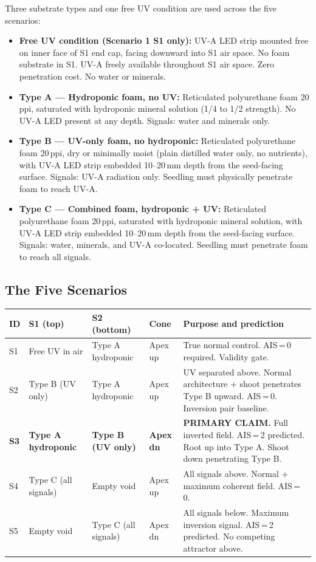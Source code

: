 \documentclass[10pt, a4paper]{article}
\begin{document}
Three substrate types and one free UV condition are
used across the five scenarios:

\begin{itemize}[itemsep=0.3em]
  \item \textbf{Free UV condition (Scenario 1 S1 only):}
    UV-A LED strip mounted free on inner face of S1 end cap,
    facing downward into S1 air space.
    No foam substrate in S1. UV-A freely available throughout
    S1 air space. Zero penetration cost.
    No water or minerals.

  \item \textbf{Type A --- Hydroponic foam, no UV:}
    Reticulated polyurethane foam 20\,ppi, saturated with
    hydroponic mineral solution (1/4 to 1/2 strength).
    No UV-A LED present at any depth.
    Signals: water and minerals only.

  \item \textbf{Type B --- UV-only foam, no hydroponic:}
    Reticulated polyurethane foam 20\,ppi, dry or minimally
    moist (plain distilled water only, no nutrients), with
    UV-A LED strip embedded 10--20\,mm depth from the
    seed-facing surface.
    Signals: UV-A radiation only.
    Seedling must physically penetrate foam to reach UV-A.

  \item \textbf{Type C --- Combined foam, hydroponic + UV:}
    Reticulated polyurethane foam 20\,ppi, saturated with
    hydroponic mineral solution, with UV-A LED strip embedded
    10--20\,mm depth from the seed-facing surface.
    Signals: water, minerals, and UV-A co-located.
    Seedling must penetrate foam to reach all signals.
\end{itemize}

\subsection{The Five Scenarios}

\begin{tabularx}{\linewidth}{p{1.1cm}p{3.0cm}p{3.0cm}p{1.1cm}X}
\toprule
\textbf{ID} & \textbf{S1 (top)} & \textbf{S2 (bottom)} &
\textbf{Cone} & \textbf{Purpose and prediction} \\
\midrule
S1 &
Free UV in air &
Type A hydroponic &
Apex up &
True normal control.
AIS\,=\,0 required.
Validity gate. \\[0.3em]
S2 &
Type B (UV only) &
Type A hydroponic &
Apex up &
UV separated above.
Normal architecture + shoot penetrates Type B upward.
AIS\,=\,0.
Inversion pair baseline. \\[0.3em]
\textbf{S3} &
\textbf{Type A hydroponic} &
\textbf{Type B (UV only)} &
\textbf{Apex dn} &
\textbf{PRIMARY CLAIM.}
Full inverted field.
AIS\,=\,2 predicted.
Root up into Type A.
Shoot down penetrating Type B. \\[0.3em]
S4 &
Type C (all signals) &
Empty void &
Apex up &
All signals above. Normal + maximum coherent field.
AIS\,=\,0. \\[0.3em]
S5 &
Empty void &
Type C (all signals) &
Apex dn &
All signals below. Maximum inversion signal.
AIS\,=\,2 predicted.
No competing attractor above. \\
\bottomrule
\end{tabularx}
\end{document}
